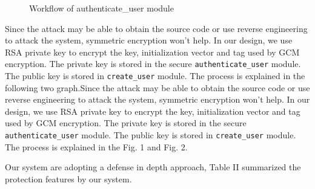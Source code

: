 \documentclass[journal]{IEEEtran}
\begin{document}
\begin{figure}[h]
\begin{minipage}{0.45\textwidth}
\caption{Workflow of authenticate\_user module}
\end{minipage}
\end{figure}

Since the attack may be able to obtain the source code or use reverse engineering to attack the system, symmetric encryption won't help. In our design, we use RSA private key to encrypt the key, initialization vector and tag used by GCM encryption. The private key is stored in the secure \texttt{authenticate\_user} module. The public key is stored in \texttt{create\_user} module. The process is explained in the following two graph.Since the attack may be able to obtain the source code or use reverse engineering to attack the system, symmetric encryption won't help. In our design, we use RSA private key to encrypt the key, initialization vector and tag used by GCM encryption. The private key is stored in the secure \texttt{authenticate\_user} module. The public key is stored in \texttt{create\_user} module. The process is explained in the Fig. 1 and Fig. 2.

Our system are adopting a defense in depth approach, Table II summarized the protection features by our system.
\end{document}
